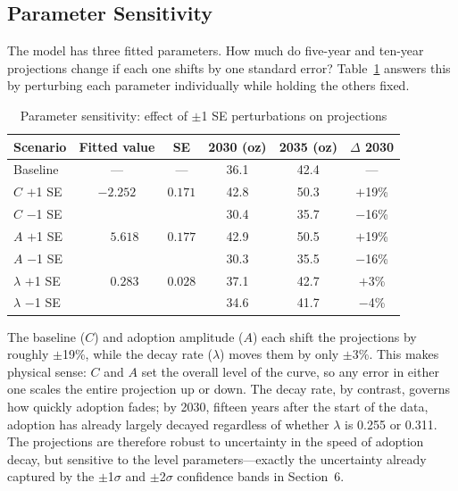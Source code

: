 \documentclass[11pt,letterpaper]{article}
\begin{document}
\subsection{Parameter Sensitivity}

The model has three fitted parameters. How much do five-year and ten-year projections change if each one shifts by one standard error? Table~\ref{tab:param_sensitivity} answers this by perturbing each parameter individually while holding the others fixed.

\begin{table}[H]
\centering
\caption{Parameter sensitivity: effect of $\pm$1 SE perturbations on projections}
\label{tab:param_sensitivity}
\begin{tabular}{@{}lccccc@{}}
\toprule
\textbf{Scenario} & \textbf{Fitted value} & \textbf{SE} & \textbf{2030 (oz)} & \textbf{2035 (oz)} & \textbf{$\Delta$ 2030} \\
\midrule
Baseline & --- & --- & 36.1 & 42.4 & --- \\
\midrule
$C$ $+$1 SE & $-2.252$ & $0.171$ & 42.8 & 50.3 & $+$19\% \\
$C$ $-$1 SE & & & 30.4 & 35.7 & $-$16\% \\
\midrule
$A$ $+$1 SE & $\phantom{-}5.618$ & $0.177$ & 42.9 & 50.5 & $+$19\% \\
$A$ $-$1 SE & & & 30.3 & 35.5 & $-$16\% \\
\midrule
$\lambda$ $+$1 SE & $\phantom{-}0.283$ & $0.028$ & 37.1 & 42.7 & $+$3\% \\
$\lambda$ $-$1 SE & & & 34.6 & 41.7 & $-$4\% \\
\bottomrule
\end{tabular}
\end{table}

The baseline ($C$) and adoption amplitude ($A$) each shift the projections by roughly $\pm$19\%, while the decay rate ($\lambda$) moves them by only $\pm$3\%. This makes physical sense: $C$ and $A$ set the overall level of the curve, so any error in either one scales the entire projection up or down. The decay rate, by contrast, governs how quickly adoption fades; by 2030, fifteen years after the start of the data, adoption has already largely decayed regardless of whether $\lambda$ is 0.255 or 0.311. The projections are therefore robust to uncertainty in the speed of adoption decay, but sensitive to the level parameters---exactly the uncertainty already captured by the $\pm$1$\sigma$ and $\pm$2$\sigma$ confidence bands in Section~6.
\end{document}
